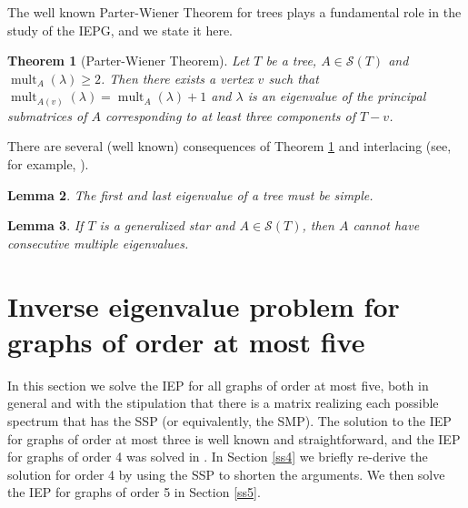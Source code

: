 \documentclass[11pt]{article}
\newtheorem{thm}{Theorem}[section]
\newtheorem{lem}[thm]{Lemma}
\theoremstyle{definition}
\theoremstyle{definition}
\theoremstyle{definition}
\DeclareMathOperator{\mult}{mult}
\newcommand{\lam}{\lambda}
\newcommand{\mptn}{\mathcal{S}} %
\begin{document}
The well known Parter-Wiener Theorem for trees plays a fundamental role in the study of the IEPG, and we state it here.

\begin{thm}[Parter-Wiener Theorem]\label{PWthm} {\rm \cite{JLDS2, P, W84}}  Let $T$ be a tree, $A\in\mptn(T)$ and $\mult_A(\lam)\ge 2$. Then there exists a vertex $v$ such that $\mult_{A(v)}(\lam)=\mult_A(\lam)+1$ and $\lam$ is an eigenvalue  of the principal submatrices of $A$ corresponding to at least three components of $T-v$.
\end{thm}

There are several (well known) consequences of Theorem \ref{PWthm} and interlacing  (see, for example, \cite%
{JLS03}).

\begin{lem}\label{firstlast}   The first and last eigenvalue of a tree must be simple.
\end{lem}

\begin{lem}\label{collision} If $T$ is a  generalized star and $A\in\mptn(T)$, then $A$ cannot have consecutive multiple eigenvalues. \end{lem}

\section{Inverse eigenvalue problem for graphs of order at most five}\label{sord5}


In this section we solve the IEP for all graphs of order at most five, both in general and with the stipulation that there is a matrix realizing each possible spectrum that has the SSP (or equivalently, the SMP).  The solution to the IEP for graphs of order at most three is well known and straightforward, and the IEP for graphs of order 4 was solved in \cite{BNSY14}.  In Section \ref{ss4} we briefly re-derive the solution for order 4 by using the SSP to shorten the arguments.  We then solve the IEP for graphs of order 5 in Section \ref{ss5}. 
\end{document}

